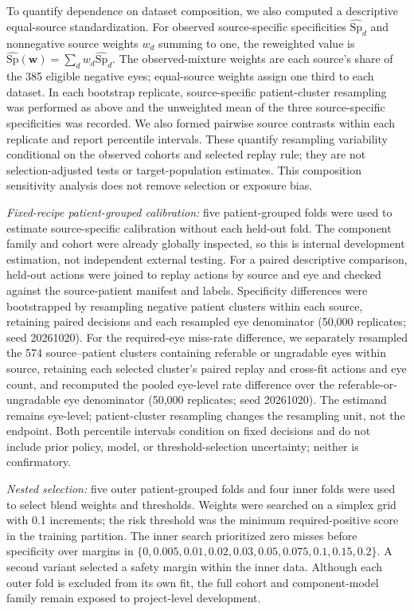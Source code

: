 \documentclass{ieeeaccess}
\begin{document}
To quantify dependence on dataset composition, we also computed a descriptive equal-source standardization. For observed source-specific specificities $\widehat{\mathrm{Sp}}_d$ and nonnegative source weights $w_d$ summing to one, the reweighted value is $\widehat{\mathrm{Sp}}(\boldsymbol{w})=\sum_d w_d\widehat{\mathrm{Sp}}_d$. The observed-mixture weights are each source's share of the 385 eligible negative eyes; equal-source weights assign one third to each dataset. In each bootstrap replicate, source-specific patient-cluster resampling was performed as above and the unweighted mean of the three source-specific specificities was recorded. We also formed pairwise source contrasts within each replicate and report percentile intervals. These quantify resampling variability conditional on the observed cohorts and selected replay rule; they are not selection-adjusted tests or target-population estimates. This composition sensitivity analysis does not remove selection or exposure bias.

\textit{Fixed-recipe patient-grouped calibration:} five patient-grouped folds were used to estimate source-specific calibration without each held-out fold. The component family and cohort were already globally inspected, so this is internal development estimation, not independent external testing. For a paired descriptive comparison, held-out actions were joined to replay actions by source and eye and checked against the source-patient manifest and labels. Specificity differences were bootstrapped by resampling negative patient clusters within each source, retaining paired decisions and each resampled eye denominator (50,000 replicates; seed 20261020). For the required-eye miss-rate difference, we separately resampled the 574 source--patient clusters containing referable or ungradable eyes within source, retaining each selected cluster's paired replay and cross-fit actions and eye count, and recomputed the pooled eye-level rate difference over the referable-or-ungradable eye denominator (50,000 replicates; seed 20261020). The estimand remains eye-level; patient-cluster resampling changes the resampling unit, not the endpoint. Both percentile intervals condition on fixed decisions and do not include prior policy, model, or threshold-selection uncertainty; neither is confirmatory.

\textit{Nested selection:} five outer patient-grouped folds and four inner folds were used to select blend weights and thresholds. Weights were searched on a simplex grid with 0.1 increments; the risk threshold was the minimum required-positive score in the training partition. The inner search prioritized zero misses before specificity over margins in $\{0,0.005,0.01,0.02,0.03,0.05,0.075,0.1,0.15,0.2\}$. A second variant selected a safety margin within the inner data. Although each outer fold is excluded from its own fit, the full cohort and component-model family remain exposed to project-level development.
\end{document}
